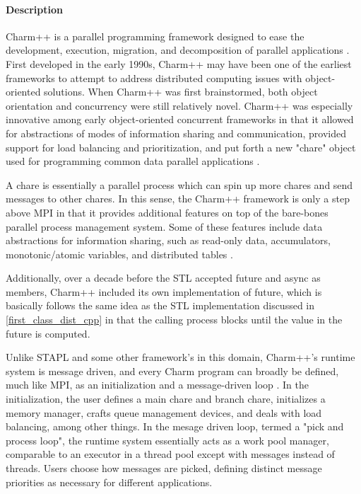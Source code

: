 \paragraph{Description} \label{charm_desc}
Charm++ is a parallel programming framework designed to ease the development, execution, migration, and decomposition of parallel applications \cite{parallel_programming_w_charm}. First developed in the early 1990s, Charm++ may have been one of the earliest frameworks to attempt to address distributed computing issues with object-oriented solutions. When Charm++ was first brainstormed, both object orientation and concurrency were still relatively novel. Charm++ was especially innovative among early object-oriented concurrent frameworks in that it allowed for abstractions of modes of information sharing and communication, provided support for load balancing and prioritization, and put forth a new "chare" object used for programming common data parallel applications \cite{charm_93}. 

A chare is essentially a parallel process which can spin up more chares and send messages to other chares. In this sense, the Charm++ framework is only a step above MPI in that it provides additional features on top of the bare-bones parallel process management system. Some of these features include data abstractions for information sharing, such as read-only data, accumulators, monotonic/atomic variables, and distributed tables \cite{charm_93}. 

Additionally, over a decade before the STL accepted future and async as members, Charm++ included its own implementation of future, which is basically follows the same idea as the STL implementation discussed in \ref{first_class_dist_cpp} in that the calling process blocks until the value in the future is computed. 

Unlike STAPL and some other framework's in this domain, Charm++'s runtime system is message driven, and every Charm program can broadly be defined, much like MPI, as an initialization and a message-driven loop \cite{charm_rts}. In the initialization, the user defines a main chare and branch chare, initializes a memory manager, crafts queue management devices, and deals with load balancing, among other things. In the mesage driven loop, termed a "pick and process loop", the runtime system essentially acts as a work pool manager, comparable to an executor in a thread pool except with messages instead of threads. Users choose how messages are picked, defining distinct message priorities as necessary for different applications.  
